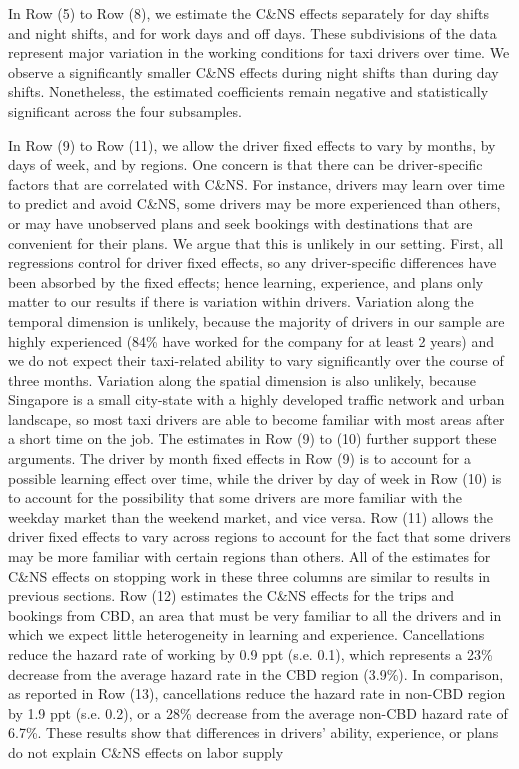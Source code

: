 \documentclass[reviewmode,AEJ]{AEA}
\begin{document}
In Row (5) to Row (8), we  estimate the C\&NS effects separately for day shifts and night shifts, and for work days and off days. These subdivisions of the data represent major variation in the working conditions for taxi drivers over time. We observe a significantly smaller C\&NS effects during night shifts than during day shifts. Nonetheless, the estimated coefficients remain negative and statistically significant across the four subsamples.


In Row (9) to Row (11), we allow the driver fixed effects to vary by months, by days of week, and by regions. One concern is that there can be driver-specific factors that  are correlated with C\&NS. For instance, drivers may learn over time to predict and avoid C\&NS, some drivers may be more experienced than others, or may have unobserved plans and seek bookings with destinations that are convenient for their plans. We argue that this is unlikely in our setting. First, all regressions control for driver fixed effects, so any driver-specific differences have been absorbed by the fixed effects;
hence learning, experience, and plans only matter to our results if there is variation within drivers. 
Variation along the temporal dimension is unlikely, because the majority of drivers in our sample are highly
experienced (84\% have worked for the company for at least 2 years) and we do not expect their taxi-related
ability to vary significantly over the course of three months. Variation along the spatial dimension is also
unlikely, because Singapore is a small city-state with a highly developed traffic network and urban landscape,
so most taxi drivers are able to become familiar with most areas after a short time on the job. The estimates in Row (9) to (10) further support these arguments. The driver by month fixed effects in Row (9) is to account for a possible learning effect over time, while the driver by day of week in Row (10) is to account for the possibility that some drivers are more familiar with the weekday market than the weekend market, and vice versa. Row (11) allows the driver fixed effects to vary across regions to account for the fact 
that some drivers may be more familiar with certain regions than others. All of the estimates for C\&NS effects
on stopping work in these three columns are %
similar to results in previous sections. Row (12) estimates the C\&NS effects for the trips and bookings from CBD, an area that must be very familiar to all the drivers and in which we expect little heterogeneity in
learning and experience. Cancellations reduce the hazard rate of working by 0.9 ppt (s.e. 0.1), which 
represents a 23\% decrease from the average hazard rate in the CBD region (3.9\%). In comparison, as
reported in Row (13), cancellations reduce the hazard rate in non-CBD region by 1.9 ppt (s.e. 0.2), 
or a 28\% decrease from the average non-CBD hazard rate of 6.7\%. These results show that differences in
drivers' ability, experience, or plans do not explain C\&NS effects on labor supply
\end{document}
